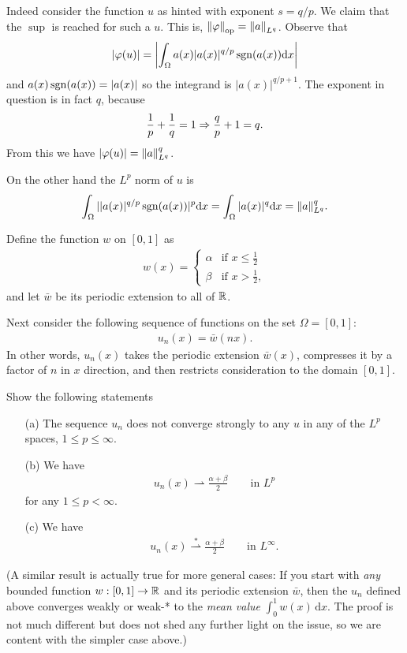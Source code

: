 \documentclass[12pt]{memoir}
\begin{document}
\begin{ptcbr}
  Indeed consider the function $u$ as hinted with exponent $s=q/p$. We claim that the $\sup$ is reached for such a $u$. This is, $\norm{\varphi}_{\text{op}}=\norm{a}_{L^q}$. Observe that 
  $$|\varphi(u)|=\left|\int_{\Omega}a(x)|a(x)|^{q/p}\operatorname{sgn}(a(x))\dd x\right|$$
  and $a(x)\operatorname{sgn}(a(x))=|a(x)|$ so the integrand is $|a(x)|^{q/p+1}$. The exponent in question is in fact $q$, because 
  $$\frac{1}{p}+\frac{1}{q}=1\Rightarrow \frac{q}{p}+1=q.$$
  From this we have $|\varphi(u)|=\norm{a}^q_{L^q}$.\par 
  On the other hand the $L^p$ norm of $u$ is 
  $$\int_\Omega||a(x)|^{q/p}\operatorname{sgn}(a(x))|^p\dd x=\int_{\Omega}|a(x)|^q\dd x=\norm{a}_{L^q}^q.$$
\end{ptcbr}
\begin{Ej}
    Define the function $w$ on $[0,1]$ as
\begin{align*}
  w(x) = \begin{cases}
    \alpha & \text{if $x\le\frac 12$} \\
    \beta & \text{if $x>\frac 12$},
  \end{cases}
\end{align*}
and let $\bar w$ be its periodic extension to all of $\mathbb{R}$.

Next consider the following sequence of functions on the set $\Omega=[0,1]$:
\begin{align*}
  u_n(x) = \bar w(nx).
\end{align*}
In other words, $u_n(x)$ takes the periodic extension $\bar w(x)$,
compresses it by a factor of $n$ in $x$ direction, and then restricts
consideration to the domain $[0,1]$.

Show the following statements
\begin{itemize}
\item[(a)] The sequence $u_n$ does not converge strongly to any $u$ in
  any of the $L^p$ spaces, $1\le p \le \infty$.

\item[(b)] We have
\begin{align*}
  u_n(x) \rightharpoonup \frac{\alpha+\beta}{2} \qquad \text{in $L^p$}
\end{align*}
for any $1\le p<\infty$.
  
\item[(c)] We have
\begin{align*}
  u_n(x) \overset{\ast}{\rightharpoonup} \frac{\alpha+\beta}{2}  \qquad \text{in $L^\infty$}.
\end{align*}
\end{itemize}

(A similar result is actually true for more general cases: If you
start with \textit{any} bounded function $w:[0,1]\rightarrow \mathbb{R}$ and its
periodic extension $\bar w$, then the $u_n$ defined above converges
weakly or weak-* to the \textit{mean value} $\int_0^1 w(x)\,
\text{d}x$. The proof is not much different but does not shed any
further light on the issue, so we are content with the simpler case above.)
\end{Ej}
\end{document}
